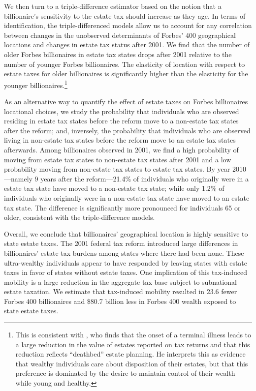 \documentclass[12pt]{article}
\begin{document}
We then turn to  a triple-difference estimator based on the notion that a billionaire's sensitivity to the estate tax should increase as they age. In terms of identification, the triple-differenced models allow us to account for any correlation between changes in the unobserved determinants of Forbes' 400 geographical locations and changes in estate tax status after 2001. We find that the number of older Forbes billionaires in estate tax states drops after 2001 relative to the number of younger Forbes billionaires. The elasticity of location  with respect to estate taxes for older billionaires is significantly higher than the elasticity for the younger billionaires.\footnote{This is consistent with \cite{wo}, who finds that the onset of a terminal illness leads to a large reduction in the value of estates reported on tax returns and that this reduction reflects  “deathbed” estate planning. He interprets this as evidence that wealthy individuals care about disposition of their estates, but that this preference is dominated by the desire to maintain control of their wealth while young and healthy. }



As an alternative way to quantify the effect of estate taxes on Forbes billionaires locational choices,  we study the probability that individuals who are observed residing in  estate tax states before the reform move  to a non-estate tax states after the reform; and, inversely, the probability  that individuals who are observed living in non-estate tax states before the reform move  to an estate tax states afterwards. 
Among billionaires observed in 2001, we find a high probability of moving  from estate tax states to non-estate tax states after 2001 and a low probability moving  from non-estate tax states to estate tax states.  By year 2010---namely 9 years after the reform---21.4\% of individuals who originally were in a estate tax state have moved to a non-estate tax state; while only 1.2\% of individuals who originally were in a non-estate tax state have moved to an estate tax state.
The difference is significantly more pronounced for individuals 65 or older, consistent with the triple-difference models. 



Overall, we conclude that billionaires' geographical location is highly sensitive to state estate taxes. The 2001 federal tax reform introduced large differences in billionaires' estate tax burdens among states where there had been none. These ultra-wealthy individuals appear to have responded by leaving states with estate taxes in favor of states without estate taxes.
One implication of this tax-induced mobility is a large reduction in the aggregate tax base subject to subnational estate taxation. We estimate that tax-induced mobility resulted in 23.6 fewer Forbes 400 billionaires and \$80.7 billion less in Forbes 400 wealth exposed to state estate taxes.
\end{document}
